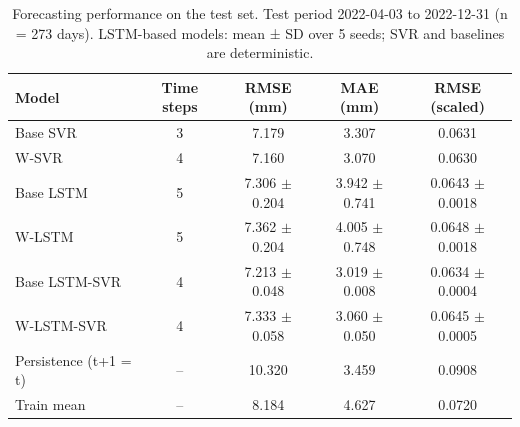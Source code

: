 \begin{table}[htbp]
\centering
\caption{Forecasting performance on the test set. Test period 2022-04-03 to 2022-12-31 (n = 273 days). LSTM-based models: mean ± SD over 5 seeds; SVR and baselines are deterministic.}
\label{tab:results}
\begin{tabular}{lcccc}
\hline
Model & Time steps & RMSE (mm) & MAE (mm) & RMSE (scaled) \\
\hline
Base SVR & 3 & 7.179 & 3.307 & 0.0631 \\
W-SVR & 4 & 7.160 & 3.070 & 0.0630 \\
Base LSTM & 5 & 7.306 $\pm$ 0.204 & 3.942 $\pm$ 0.741 & 0.0643 $\pm$ 0.0018 \\
W-LSTM & 5 & 7.362 $\pm$ 0.204 & 4.005 $\pm$ 0.748 & 0.0648 $\pm$ 0.0018 \\
Base LSTM-SVR & 4 & 7.213 $\pm$ 0.048 & 3.019 $\pm$ 0.008 & 0.0634 $\pm$ 0.0004 \\
W-LSTM-SVR & 4 & 7.333 $\pm$ 0.058 & 3.060 $\pm$ 0.050 & 0.0645 $\pm$ 0.0005 \\
Persistence (t+1 = t) & -- & 10.320 & 3.459 & 0.0908 \\
Train mean & -- & 8.184 & 4.627 & 0.0720 \\
\hline
\end{tabular}
\end{table}